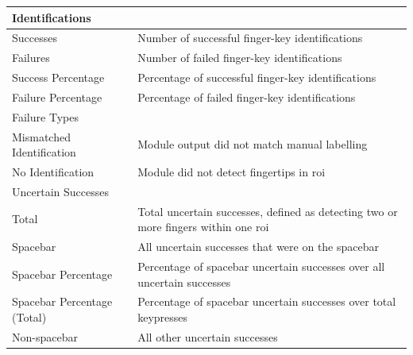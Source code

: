 \documentclass{report}
\begin{document}
\begin{table}[H]
	\small
	\centering
	\begin{tabular}{ p{} p{} }
		\toprule
		Identifications                                                                                                                    \\
		\midrule
		Successes                                & Number of successful finger-key identifications                                         \\
		Failures                                 & Number of failed finger-key identifications                                             \\
		Success Percentage                       & Percentage of successful finger-key identifications                                     \\
		Failure Percentage                       & Percentage of failed finger-key identifications
		\\[0.25cm]
		\midrule
		Failure Types                                                                                                                      \\
		\midrule
		Mismatched Identification                & Module output did not match manual labelling                                            \\
		No Identification                        & Module did not detect fingertips in \ac{roi}
		\\[0.25cm]
		\midrule
		Uncertain Successes                                                                                                                \\
		\midrule
		Total                                    & Total uncertain successes, defined as detecting two or more fingers within one \ac{roi} \\
		Spacebar                                 & All uncertain successes that were on the spacebar                                       \\
		Spacebar Percentage                      & Percentage of spacebar uncertain successes over all uncertain successes                 \\
		Spacebar Percentage (Total)              & Percentage of spacebar uncertain successes over total keypresses                        \\
		Non-spacebar                             & All other uncertain successes                                                           \\

\end{tabular}
\end{table}
\end{document}
